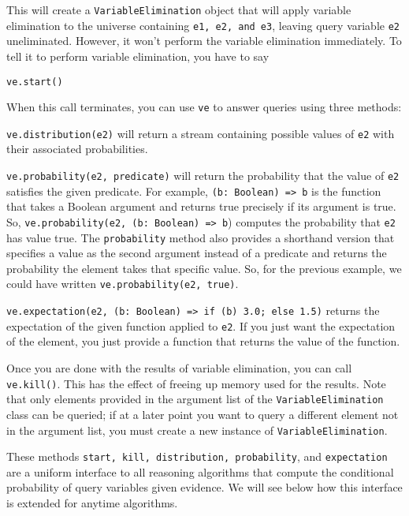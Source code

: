 This will create a \texttt{VariableElimination} object that will apply variable elimination to the universe containing \texttt{e1, e2, and e3}, leaving query variable \texttt{e2} uneliminated. However, it won't perform the variable elimination immediately. To tell it to perform variable elimination, you have to say

\begin{flushleft}
\texttt{ve.start()}
\end{flushleft}

When this call terminates, you can use \texttt{ve} to answer queries using three methods:

\texttt{ve.distribution(e2)}  will return a stream containing possible values of \texttt{e2} with their associated probabilities.

\texttt{ve.probability(e2, predicate)} will return the probability that the value of \texttt{e2} satisfies the given predicate. For example, \texttt{(b: Boolean) => b} is the function that takes a  Boolean argument and returns true precisely if its argument is true. So, \texttt{ve.probability(e2, (b: Boolean) => b}) computes the probability that \texttt{e2} has value true. The \texttt{probability} method also provides a shorthand version that specifies a value as the second argument instead of a predicate and returns the probability the element takes that specific value. So, for the previous example, we could have written \texttt{ve.probability(e2, true)}.

\texttt{ve.expectation(e2, (b: Boolean) => if (b) 3.0; else 1.5)} returns the
expectation of the given function applied to \texttt{e2}. If you just want the expectation of the element, you just provide a function that returns the value of the function.

Once you are done with the results of variable elimination, you can call \texttt{ve.kill()}. This has the effect of freeing up memory used for the results. Note that only elements provided in the argument list of the \texttt{VariableElimination} class can be queried; if at a later point you want to query a different element not in the argument list, you must create a new instance of \texttt{VariableElimination}. 

These methods \texttt{start, kill,  distribution, probability}, and \texttt{ex\-pectation} are a uniform interface to all reasoning algorithms that compute the conditional probability of query variables given evidence. We will see below how this interface is extended for anytime algorithms.

